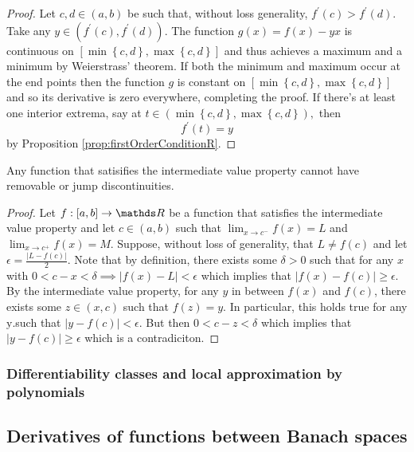 \begin{proof}
Let $c,d\in\left(a,b\right)$ be such that, without loss generality,
$f^{\prime}\left(c\right)>f^{\prime}\left(d\right).$ Take any $y\in\left(f^{\prime}\left(c\right),f^{\prime}\left(d\right)\right)$.
The function $g\left(x\right)=f\left(x\right)-yx$ is continuous on
$\left[\min\left\{ c,d\right\} ,\max\left\{ c,d\right\} \right]$
and thus achieves a maximum and a minimum by Weierstrass' theorem.
If both the minimum and maximum occur at the end points then the function
$g$ is constant on $\left[\min\left\{ c,d\right\} ,\max\left\{ c,d\right\} \right]$
and so its derivative is zero everywhere, completing the proof. If
there's at least one interior extrema, say at $t\in\left(\min\left\{ c,d\right\} ,\max\left\{ c,d\right\} \right),$
then
\[
f^{\prime}\left(t\right)=y
\]
by Proposition \ref{prop:firstOrderConditionR}.
\end{proof}
\begin{lem}
\label{lem:IVTJump}Any function that satisifies the intermediate
value property cannot have removable or jump discontinuities.
\end{lem}

\begin{proof}
Let $f:\left[a,b\right]\to\R$ be a function that satisfies the intermediate
value property and let $c\in\left(a,b\right)$ such that $\lim_{x\to c^{-}}f\left(x\right)=L$
and $\lim_{x\to c^{+}}f\left(x\right)=M$. Suppose, without loss of
generality, that $L\neq f\left(c\right)$ and let $\epsilon=\frac{\lvert L-f\left(c\right)\rvert}{2}.$
Note that by definition, there exists some $\delta>0$ such that for
any $x$ with $0<c-x<\delta\implies\lvert f\left(x\right)-L\rvert<\epsilon$
which implies that $\lvert f\left(x\right)-f\left(c\right)\rvert\geq\epsilon.$
By the intermediate value property, for any $y$ in between $f\left(x\right)$
and $f\left(c\right)$, there exists some $z\in\left(x,c\right)$
such that $f\left(z\right)=y.$ In particular, this holds true for
any $\text{y}.$such that $\lvert y-f\left(c\right)\rvert<\epsilon.$
But then $0<c-z<\delta$ which implies that $\lvert y-f\left(c\right)\rvert\geq\epsilon$
which is a contradiciton.
\end{proof}

\subsubsection{Differentiability classes and local approximation by polynomials}

\subsection{Derivatives of functions between Banach spaces}

